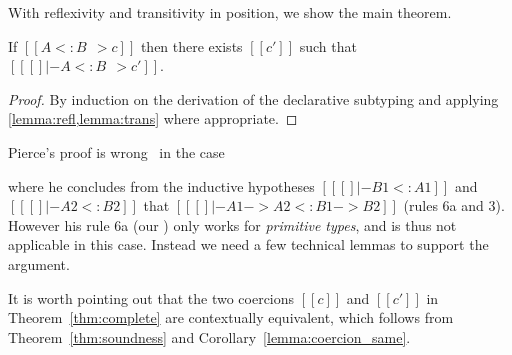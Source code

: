 With reflexivity and transitivity in position, we show the main theorem.

\renewcommand\ottaltinferrule[4]{
  \inferrule*[narrower=0.5,right=#1,#2]
    {#3}
    {#4}
}
\begin{theorem}[Completeness] \label{thm:complete}
  If $[[A <: B ~~> c]]$ then there exists $[[c']]$ such that $[[ [] |- A <: B ~~> c']]$.
\end{theorem}
\begin{proof}
  By induction on the derivation of the declarative subtyping and applying \cref{lemma:refl,lemma:trans} where appropriate.
\end{proof}
\begin{remark}
  Pierce's proof is wrong~\cite[pp.~20, Case~F]{pierce1989decision} in the case
  \begin{mathpar}
  \end{mathpar}
  where he concludes from the inductive
  hypotheses $[[ [] |- B1 <: A1]]$ and $[[ [] |- A2 <: B2]]$ that $[[ [] |- A1 -> A2 <: B1 -> B2]]$ (rules 6a and 3).
  However his rule 6a (our ) only works for \textit{primitive types}, and is thus not applicable in this case. Instead we
  need a few technical lemmas to support the argument.
\end{remark}

\begin{remark}
  It is worth pointing out that the two coercions $[[c]]$ and $[[c']]$ in
  Theorem~\ref{thm:complete} are contextually equivalent, which follows from
  Theorem~\ref{thm:soundness} and Corollary~\ref{lemma:coercion_same}.
\end{remark}

